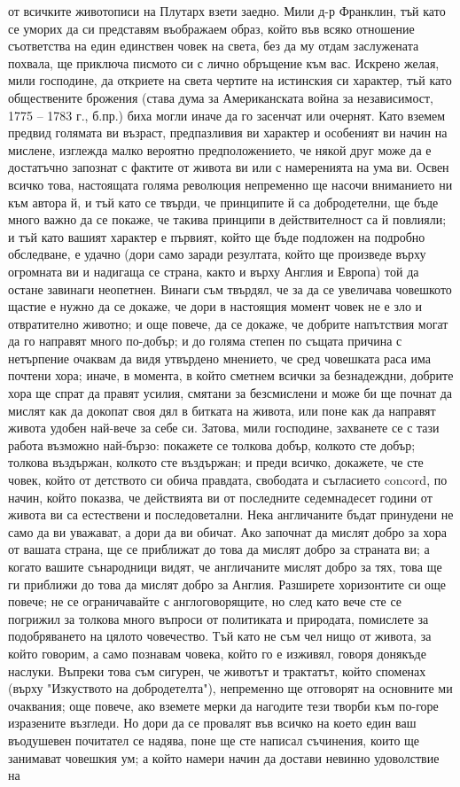 \documentclass[12pt]{book}
\begin{document}
от всичките животописи на Плутарх взети заедно. Мили д-р Франклин, тъй като се уморих да си представям въображаем образ, който във всяко отношение съответства на един единствен човек на света, без да му отдам заслужената похвала, ще приключа писмото си с лично обръщение към вас. Искрено желая, мили господине, да откриете на света чертите на истинския си характер, тъй като обществените брожения (става дума за Американската война за независимост, 1775 – 1783 г., б.пр.) биха могли иначе да го засенчат или очернят. Като вземем предвид голямата ви възраст, предпазливия ви характер и особеният ви начин на мислене, изглежда малко вероятно предположението, че някой друг може да е достатъчно запознат с фактите от живота ви или с намеренията на ума ви. Освен всичко това, настоящата голяма революция непременно ще насочи вниманието ни към автора й, и тъй като се твърди, че принципите й са добродетелни, ще бъде много важно да се покаже, че такива принципи в действителност са й повлияли; и тъй като вашият характер е първият, който ще бъде подложен на подробно обследване, е удачно (дори само заради резултата, който ще произведе върху  огромната ви и надигаща се страна, както и върху Англия и Европа) той да остане завинаги неопетнен. Винаги съм твърдял, че за да се увеличава човешкото щастие е нужно да се докаже, че дори в настоящия момент човек не е зло и отвратително животно; и още повече, да се докаже, че добрите напътствия могат да го направят много по-добър; и до голяма степен по същата причина с нетърпение очаквам да видя утвърдено мнението, че сред човешката раса има почтени хора; иначе, в момента, в който сметнем всички за безнадеждни, добрите хора ще спрат да правят усилия, смятани за безсмислени и може би ще почнат да мислят как да докопат своя дял в битката на живота, или поне как да направят живота удобен най-вече за себе си. Затова, мили господине, захванете се с тази работа възможно най-бързо: покажете се толкова добър, колкото сте добър; толкова въздържан, колкото сте въздържан; и преди всичко, докажете, че сте човек, който от детството си обича правдата, свободата и съгласието concord, по начин, който показва, че действията ви от последните седемнадесет години от живота ви са естествени и последоветални. Нека англичаните бъдат принудени не само да ви уважават, а дори да ви обичат. Ако започнат да мислят добро за хора от вашата страна, ще се приближат до това да мислят добро за страната ви; а когато вашите сънародници видят, че англичаните мислят добро за тях, това ще ги приближи до това да мислят добро за Англия. Разширете хоризонтите си още повече; не се ограничавайте с англоговорящите, но след като вече сте се погрижил за толкова много въпроси от политиката и природата, помислете за подобряването на цялото човечество. Тъй като не съм чел нищо от живота, за който говорим, а само познавам човека, който го е изживял, говоря донякъде наслуки. Въпреки това съм сигурен, че животът и трактатът, който споменах (върху "Изкуството на добродетелта"), непременно ще отговорят на основните ми очаквания; още повече, ако вземете мерки да нагодите тези творби към по-горе изразените възгледи. Но дори да се провалят във всичко на което един ваш въодушевен почитател се надява, поне ще сте написал съчинения, които ще занимават човешкия ум; а който намери начин да достави невинно удоволствие на 
\end{document}
